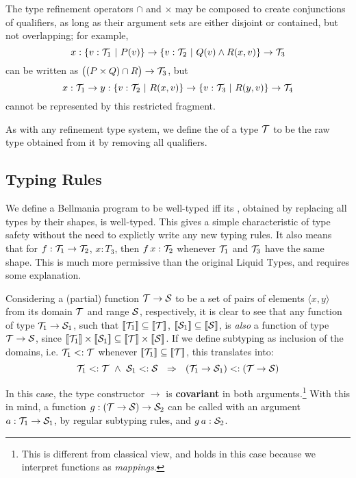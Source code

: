 The type refinement operators $\cap$ and $\times$ may be composed to create conjunctions of qualifiers,
as long as their argument sets are either disjoint or contained, but not overlapping;
for example, \[x:\{v:\T_1~|~P(v)\}\to \{v:\T_2~|~Q(v)\land R(x,v)\}\to\T_3\] can be written as
$\big((P\times Q)\cap R\big)\to\T_3$, but \[x:\T_1\to y:\{v:\T_2~|~R(x,v)\} \to \{v:\T_3~|~R(y,v)\}\to\T_4\]
cannot be represented by this restricted fragment.

As with any refinement type system, we define the  of a type $\T$ to be the raw type
obtained from it by removing all qualifiers.

\subsection{Typing Rules}
\label{lang:typing rules}

\newcommand\powerset[1]{\mathbf{P}({#1})}

We define a Bellmania program to be well-typed iff its , obtained by replacing all types by
their shapes, is well-typed. This gives a simple characteristic of type safety without the need to
explictly write any new typing rules. It also means that for $f:\T_1\to\T_2$, $x:T_3$, then $f\,x:\T_2$ whenever
$\T_1$ and $\T_3$ have the same shape. This is much more permissive than the original Liquid Types,
and requires some explanation.

Considering a (partial) function $\T\to\S$ to be a set of pairs of elements $\langle x,y\rangle$ 
from its domain $\T$ and range $\S$, respectively, it is clear to see that any function of type $\T_1\to\S_1$,
such that $\semp{\T_1}\subseteq\semp{\T}$, $\semp{\S_1}\subseteq\semp{\S}$, 
is \emph{also} a function of type $\T\to\S$, since $\semp{\T_1}\times\semp{\S_1}\subseteq\semp{\T}\times\semp{\S}$.
If we define subtyping as inclusion of the domains, i.e. $\T_1 <:\T$ whenever $\semp{\T_1}\subseteq\semp{\T}$,
this translates into:
%
\[\T_1<:\T ~\land~ \S_1<:\S ~~\Rightarrow~~ (\T_1\to\S_1) <: (\T\to\S)\]

In this case, the type constructor $\to$ is {\bf covariant} in both arguments.\footnote{This is different from classical view, and holds in this case because we interpret functions as \emph{mappings}.}
With this in mind, a function $g:(\T\to\S)\to \S_2$ can be called with an argument $a: \T_1\to\S_1$,
by regular subtyping rules, and $g\,a : \S_2$.

